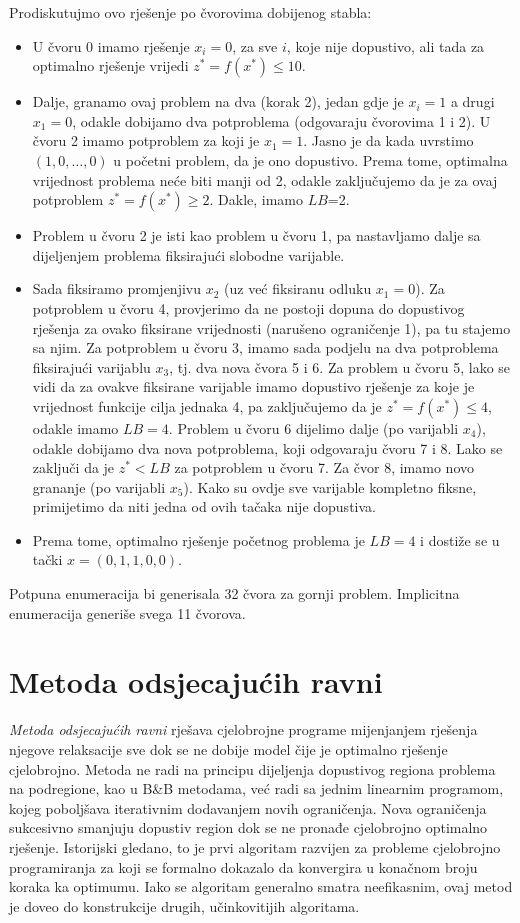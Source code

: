 \documentclass[a4paper, utf8, 11pt, colorlinks]{book}
\begin{document}
Prodiskutujmo ovo rješenje po čvorovima dobijenog stabla:
  \begin{itemize}
      \item U čvoru 0 imamo  rješenje $x_i = 0$, za sve $i$, koje  nije dopustivo, ali  tada za optimalno rješenje vrijedi $z^*=f(x^*) \leq 10$.
      \item  Dalje, granamo ovaj problem na dva (korak 2), jedan gdje je $x_i=1$ a drugi $x_1=0$, odakle dobijamo dva potproblema (odgovaraju čvorovima 1 i 2). U čvoru 2 imamo potproblem za koji je $x_1=1$. Jasno je da kada uvrstimo $(1,0, \ldots, 0)$ u početni problem, da je ono dopustivo. Prema tome, optimalna vrijednost problema neće biti manji od 2, odakle zaključujemo da je za ovaj potproblem $z^*=f(x^*) \geq 2$. Dakle, imamo $LB$=2. 
      \item Problem u čvoru 2 je isti kao problem u čvoru 1, pa nastavljamo dalje sa dijeljenjem problema fiksirajući slobodne varijable. 
      \item Sada fiksiramo promjenjivu $x_2$ (uz već fiksiranu odluku $x_1=0$). 
            Za potproblem u čvoru 4, provjerimo da ne postoji dopuna do dopustivog rješenja za ovako fiksirane vrijednosti (narušeno ograničenje 1), pa tu stajemo sa njim. Za potproblem u čvoru 3, imamo sada podjelu na dva potproblema fiksirajući varijablu $x_3$, tj. dva   nova čvora 5 i 6. Za problem u čvoru 5, lako se vidi da za ovakve fiksirane varijable imamo dopustivo rješenje za koje je vrijednost funkcije cilja jednaka 4, pa zaključujemo da je $z^*=f(x^*) \leq 4$, odakle imamo $LB=4$. Problem u čvoru 6 dijelimo dalje (po varijabli $x_4$), odakle dobijamo dva nova potproblema, koji odgovaraju čvoru 7 i 8. Lako se zaključi da je $z^*<LB$ za   potproblem u čvoru 7.  Za čvor 8, imamo novo grananje (po varijabli $x_5$). Kako su ovdje sve varijable kompletno fiksne, primijetimo da niti jedna od ovih tačaka  nije dopustiva.
            \item Prema tome, optimalno rješenje početnog problema je $LB=4$ i dostiže se u tački $x=(0, 1, 1, 0, 0)$. 
  \end{itemize}
  Potpuna enumeracija bi generisala 32 čvora za gornji problem. Implicitna enumeracija generiše svega 11 čvorova. 
 
\section{Metoda odsjecajućih ravni}
  
\emph{Metoda odsjecajućih ravni} rješava cjelobrojne programe mijenjanjem rješenja njegove relaksacije sve dok se ne dobije model čije je optimalno rješenje cjelobrojno. Metoda ne radi  na principu dijeljenja dopustivog regiona problema na podregione, kao u B\&B metodama, već radi sa jednim linearnim programom, kojeg poboljšava iterativnim dodavanjem novih ograničenja. Nova ograničenja sukcesivno smanjuju dopustiv region dok se ne pronađe cjelobrojno optimalno rješenje.   
 Istorijski gledano, to je prvi algoritam razvijen za probleme cjelobrojno programiranja za koji se formalno dokazalo da konvergira u konačnom broju
koraka ka optimumu. Iako se algoritam generalno smatra   neefikasnim, ovaj metod je doveo do konstrukcije drugih, učinkovitijih algoritama.  
  
\end{document}
